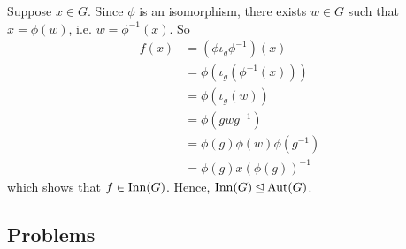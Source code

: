 \begin{questions}
    Suppose $x \in G$. Since $\phi$ is an isomorphism, there exists $w \in G$ such that $x = \phi(w)$, i.e. $w = \phi^{-1}(x)$. So
    \begin{align*}
        f(x) &= \left(\phi\iota_g\phi^{-1}\right)(x)\\
        &= \phi(\iota_g(\phi^{-1}(x)))\\
        &= \phi(\iota_g(w))\\
        &= \phi(gwg^{-1})\\
        &= \phi(g)\phi(w)\phi(g^{-1})\\
        &= \phi(g)x\left(\phi(g)\right)^{-1}
    \end{align*}
    which shows that $f \in \mathrm{Inn}(G)$. Hence, $\mathrm{Inn}(G) \unlhd \mathrm{Aut}(G)$.
\end{questions}

\subsection*{Problems}
